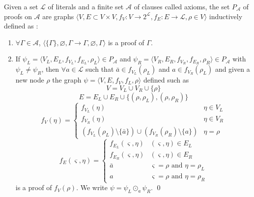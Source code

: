\documentclass{llncs}
\newcommand{\dual}[1]{{\ensuremath{\bar{#1}}}}
\begin{document}
\begin{definition}[Proof] \label{def:proof}
Given a set $\mathcal{L}$ of literals and a finite set $\mathcal{A}$ of clauses called axioms, the
set $P_\mathcal{A}$ of proofs on $\mathcal{A}$ are graphs $\langle V, E \subset V \times V, f_V : V
\longrightarrow 2^\mathcal{L}, f_E : E \longrightarrow \mathcal{L}, \rho \in V \rangle$ inductively
defined as :
\begin{enumerate}[nosep]
  \item $\forall \Gamma \in \mathcal{A}$, $\langle \{\Gamma\}, \varnothing, \Gamma
    \rightarrow \Gamma, \varnothing, \Gamma \rangle$ is a proof of $\Gamma$.
  \item If $\psi_L = \langle V_L, E_L, f_{V_L}, f_{E_L}, \rho_L \rangle \in P_\mathcal{A}$ and
    $\psi_R = \langle V_R, E_R, f_{V_R}, f_{E_R}, \rho_R \rangle \in P_\mathcal{A}$ with $\psi_L
    \neq \psi_R$, then $\forall a \in \mathcal{L}$ such that $\dual{a} \in f_{V_L}(\rho_L)$ and $a
    \in f_{V_R}(\rho_L)$ and given a new node $\rho$ the graph $\psi = \langle V,E, f_V, f_L, \rho
    \rangle$ defined such as
    \begin{equation*}
      V = V_L \cup V_R \cup \{\rho\}
    \end{equation*}
    \begin{equation*}
      E = E_L \cup E_R \cup \{(\rho,\rho_L),(\rho,\rho_R)\}
    \end{equation*}
    \begin{equation*}
      f_V(\eta) = \begin{cases}
        f_{V_L}(\eta) & \eta \in V_L \\
        f_{V_R}(\eta) & \eta \in V_R \\
        (f_{V_L}(\rho_L) \setminus \{\dual{a}\}) \cup (f_{V_R}(\rho_R) \setminus \{a\}) &
          \eta = \rho
      \end{cases}
    \end{equation*}
    \begin{equation*}
      f_E(\varsigma,\eta) = \begin{cases}
        f_{E_L}(\varsigma,\eta) & (\varsigma,\eta) \in E_L \\
        f_{E_R}(\varsigma,\eta) & (\varsigma,\eta) \in E_R \\
        \dual{a} & \varsigma = \rho \text{ and } \eta = \rho_L \\
        a        & \varsigma = \rho \text{ and } \eta = \rho_R
      \end{cases}
    \end{equation*}
    is a proof of $f_V(\rho)$. We write $\psi = \psi_L \odot_a \psi_R$.
  \qed
\end{enumerate}
\end{definition}
\end{document}
